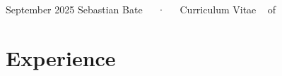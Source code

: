 \documentclass[11pt,a4paper,]{awesome-cv}
\begin{document}
\makecvheader

\makecvfooter
  {September 2025}
    {Sebastian Bate~~~·~~~Curriculum Vitae}
  {\thepage~ of \pageref{LastPage}~}





\section{Experience}\label{experience}
\end{document}

